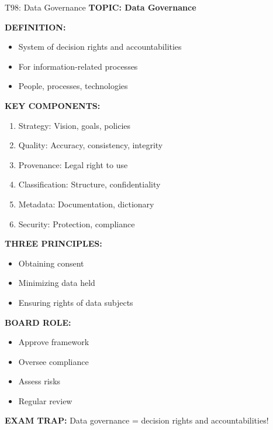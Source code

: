 \documentclass[8pt]{beamer}
\begin{document}
	\begin{frame}{T98: Data Governance}
		\fontsize{6.5}{7.5}\selectfont
		\textbf{TOPIC: Data Governance}
		
		\vspace{0.1cm}
		\textbf{DEFINITION:}
		\begin{itemize}
			\item System of decision rights and accountabilities
			\item For information-related processes
			\item People, processes, technologies
		\end{itemize}
		
		\vspace{0.1cm}
		\textbf{KEY COMPONENTS:}
		\begin{enumerate}
			\item \textcolor{myblue}{Strategy:} Vision, goals, policies
			\item \textcolor{myblue}{Quality:} Accuracy, consistency, integrity
			\item \textcolor{myblue}{Provenance:} Legal right to use
			\item \textcolor{myblue}{Classification:} Structure, confidentiality
			\item \textcolor{myblue}{Metadata:} Documentation, dictionary
			\item \textcolor{myblue}{Security:} Protection, compliance
		\end{enumerate}
		
		\vspace{0.1cm}
		\textbf{THREE PRINCIPLES:}
		\begin{itemize}
			\item Obtaining consent
			\item Minimizing data held
			\item Ensuring rights of data subjects
		\end{itemize}
		
		\vspace{0.1cm}
		\textbf{BOARD ROLE:}
		\begin{itemize}
			\item Approve framework
			\item Oversee compliance
			\item Assess risks
			\item Regular review
		\end{itemize}
		
		\textcolor{myred}{\textbf{EXAM TRAP:}} Data governance = \textcolor{myblue}{decision rights and accountabilities}!
	\end{frame}
	
\end{document}
